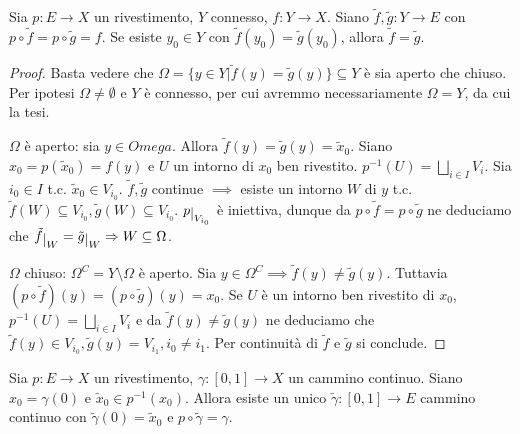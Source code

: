 \begin{prop} \label{unic_soll}
  Sia $p: E \rightarrow X$ un rivestimento, $Y$ connesso, $f: Y \rightarrow X$. Siano $\tilde{f}, \tilde{g}: Y \rightarrow E$ con $p \circ \tilde{f}=p \circ \tilde{g}=f$. Se esiste $y_0 \in Y$ con $\tilde{f}(y_0)=\tilde{g}(y_0)$, allora $\tilde{f}=\tilde{g}$.
\end{prop}

\begin{proof}
  Basta vedere che $\Omega=\{ y \in Y | \tilde{f}(y)=\tilde{g}(y)\} \subseteq Y$ è sia aperto che chiuso. Per ipotesi $\Omega \not= \emptyset$ e $Y$ è connesso, per cui avremmo necessariamente $\Omega=Y$, da cui la tesi.

  $\Omega$ è aperto: sia $y \in Omega$. Allora $\tilde{f}(y)=\tilde{g}(y)=\tilde{x}_0$. Siano $x_0=p(\tilde{x}_0)=f(y)$ e $U$ un intorno di $x_0$ ben rivestito.
  $\displaystyle p^{-1}(U)=\bigsqcup_{i \in I} V_i$. Sia $i_0 \in I$ t.c. $\tilde{x}_0 \in V_{i_0}$.
  $\tilde{f}, \tilde{g}$ continue $\implies$ esiste un intorno $W$ di $y$ t.c. $\tilde{f}(W) \subseteq V_{i_0}, \tilde{g}(W) \subseteq V_{i_0}$.
  $p \restrict{V_{i_0}}$ è iniettiva, dunque da $p \circ \tilde{f}=p \circ \tilde{g}$ ne deduciamo che $\tilde{f} \restrict{W}=\tilde{g} \restrict{W} \implies W \subseteq \Omega$.

  $\Omega$ chiuso: $\Omega^C=Y \setminus \Omega$ è aperto. Sia $y \in \Omega^C \implies \tilde{f}(y) \not= \tilde{g}(y)$. Tuttavia $(p \circ \tilde{f})(y)=(p \circ \tilde{g})(y)=x_0$.
  Se $U$ è un intorno ben rivestito di $x_0$, $\displaystyle p^{-1}(U)=\bigsqcup_{i \in I} V_i$ e da $\tilde{f}(y) \not= \tilde{g}(y)$ ne deduciamo che $\tilde{f}(y) \in V_{i_0}, \tilde{g}(y)=V_{i_1}, i_0 \not= i_1$. Per continuità di $\tilde{f}$ e $\tilde{g}$ si conclude.
\end{proof}

\begin{thm}
  Sia $p:E \rightarrow X$ un rivestimento, $\gamma:[0, 1] \rightarrow X$ un cammino continuo. Siano $x_0=\gamma(0)$ e $\tilde{x}_0 \in p^{-1}(x_0)$.
  Allora esiste un unico $\tilde{\gamma}:[0, 1] \rightarrow E$ cammino continuo con $\tilde{\gamma}(0)=\tilde{x}_0$ e $p \circ \tilde{\gamma}=\gamma$.
\end{thm}

